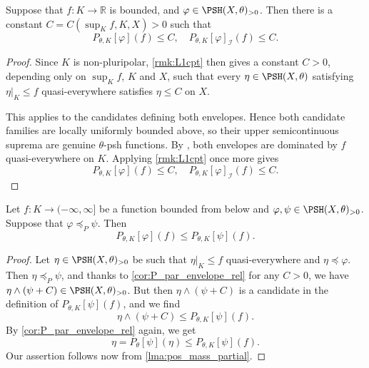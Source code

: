 \begin{corollary}\label{cor:Ppartbdd_bdabove}
    Suppose that $f\colon K\rightarrow \mathbb{R}$ is bounded, and $\varphi\in \PSH(X,\theta)_{>0}$. Then there is a constant $C=C(\sup_K f,K,X)>0$ such that
        \[
            P_{\theta,K}[\varphi](f)\leq C,\quad P_{\theta,K}[\varphi]_{\mathcal{I}}(f)\leq C.
        \]
\end{corollary}
\begin{proof}
    Since $K$ is non-pluripolar, \cref{rmk:L1cpt} then gives a constant $C>0$, depending only on $\sup_K f$, $K$ and $X$, such that every $\eta\in\PSH(X,\theta)$ satisfying $\eta|_K\leq f$ quasi-everywhere satisfies $\eta\leq C$ on $X$.

    This applies to the candidates defining both envelopes. Hence both candidate families are locally uniformly bounded above, so their upper semicontinuous suprema are genuine $\theta$-psh functions. By , both envelopes are dominated by $f$ quasi-everywhere on $K$. Applying \cref{rmk:L1cpt} once more gives
    \[
        P_{\theta,K}[\varphi](f)\leq C,\quad P_{\theta,K}[\varphi]_{\mathcal I}(f)\leq C.
    \]
\end{proof}


\begin{proposition}\label{prop:Penv_partial_monotone}
    Let $f\colon K\rightarrow (-\infty,\infty]$ be a function bounded from below and $\varphi,\psi\in \PSH(X,\theta)_{>0}$. Suppose that $\varphi\preceq_{P} \psi$. Then
    \[
    P_{\theta,K}[\varphi](f)\leq P_{\theta,K}[\psi](f).
    \]
\end{proposition}
\begin{proof}
    Let $\eta\in \PSH(X,\theta)_{>0}$ be such that $\eta|_K\leq f$ quasi-everywhere and $\eta\preceq \varphi$. Then $\eta\preceq_P \psi$, and thanks to \cref{cor:P_par_envelope_rel} for any $C>0$, we have $\eta\land (\psi+C)\in \PSH(X,\theta)_{>0}$. But then $\eta\land (\psi+C)$ is a candidate in the definition of $P_{\theta,K}[\psi](f)$, and we find
    \[
    \eta\land (\psi+C)\leq P_{\theta,K}[\psi](f).
    \]
    By \cref{cor:P_par_envelope_rel} again, we get
    \[
    \eta=P_{\theta}[\psi](\eta)\leq P_{\theta,K}[\psi](f).
    \]
    Our assertion follows now from \cref{lma:pos_mass_partial}.
\end{proof}

